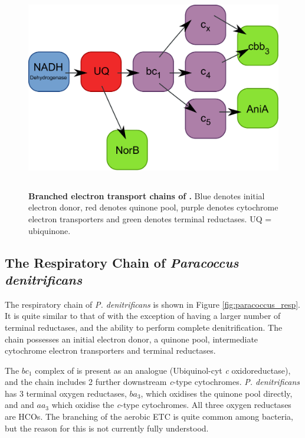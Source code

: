 \begin{figure}[tbp]
\begin{center}
	\includegraphics[height=9cm]{01-introduction/data/nm_resp.pdf}
	\caption[{Branched electron transport chains of \Nm{}.}]{{\bf Branched electron transport chains of \Nm{}.} Blue denotes initial electron donor, red denotes quinone pool, purple denotes cytochrome electron transporters and green denotes terminal reductases. UQ = ubiquinone.
	\label{fig:nm_resp}}
\end{center}
\end{figure}

\subsection{The Respiratory Chain of \textit{Paracoccus denitrificans}}
The respiratory chain of \textit{P. denitrificans} is shown in Figure \ref{fig:paracoccus_resp}. It is quite similar to that of \Nm{} with the exception of having a larger number of terminal reductases, and the ability to perform complete denitrification. The chain possesses an initial electron donor, a quinone pool, intermediate cytochrome electron transporters and terminal reductases.

The $bc_1$ complex of \Nm{} is present as an analogue (Ubiquinol-cyt \textit{c} oxidoreductase), and the chain includes 2 further downstream \textit{c}-type cytochromes. \textit{P. denitrificans} has 3 terminal oxygen reductases, $ba_3$, which oxidises the quinone pool directly, and \cbbthree{} and $aa_3$ which oxidise the \textit{c}-type cytochromes. All three oxygen reductases are HCOs. The branching of the aerobic ETC is quite common among bacteria, but the reason for this is not currently fully understood.

